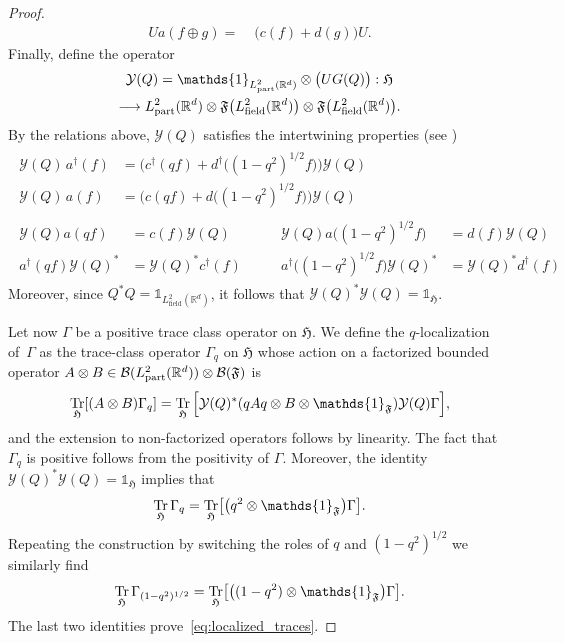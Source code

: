 \documentclass[10pt]{amsart}
\theoremstyle{definition}\newtheorem{defi}[theo]{Definition}\newtheorem{rema}[theo]{Remark}\newtheorem{exam}[theo]{Example}\newtheorem{exem}[theo]{Example}\newtheorem{nota}[theo]{Notation}
\DeclareMathOperator{\Tr}{Tr}
\DeclareMathOperator{\partt}{part}
\DeclareMathOperator{\field}{field}
\newcommand{\cY}{\mathcal{Y}}
\newcommand{\R}{\mathbb{R}}
\newcommand{\gH}{\mathfrak{H}}
\newcommand{\gF}{\mathfrak{F}}
\newcommand{\cB}{\mathcal{B}}
\newcommand{\1}{\mathds{1}}
\let\oldin\in
\renewcommand{\in}{\mathchoice{\oldin}{\oldin}{\,\oldin\,}{\,\oldin\,}}
\renewcommand*{\to}{\mathchoice{\longrightarrow}{\rightarrow}{\rightarrow}{\rightarrow}}
\let\originalleft\left
\let\originalright\right
\renewcommand{\left}{\mathopen{}\mathclose\bgroup\originalleft}
\renewcommand{\right}{\aftergroup\egroup\originalright}
\begin{document}
\begin{proof}
\begin{equation}
\begin{split}
Ua(f\oplus g)=\;&\big(c(f)+d(g)\big)U.
\end{split}
\end{equation}
Finally, define the operator
\begin{multline}
\cY(Q)= \1_{L^2_{\partt}(\R^d)}\otimes \big(UG(Q)\big): \gH\\
\to L^2_{\partt}(\R^d) \otimes \gF\big(L^2_{\field}(\R^d)\big) \otimes \gF\big(L^2_{\field}(\R^d)\big).
\end{multline}
By the relations above, $\cY(Q)$ satisfies the intertwining properties (see \cite[Lemmas~2.14 and 2.15]{DerGer-99})
\begin{equation}\label{eq:intertwining}
\begin{gathered}
\begin{aligned}
\cY(Q)\,a^\dagger(f) &= \Big(c^\dagger(qf)+d^\dagger\big((1-q^2)^{1/2}f\big) \Big)\cY(Q)\\
\cY(Q)\,a(f)&= \Big(c(qf)+d\big((1-q^2)^{1/2}f\big) \Big)\cY(Q)
\end{aligned}
\\
\begin{aligned}
\cY(Q)a(qf) &=c(f)\cY (Q)\qquad &\cY(Q)a\big((1-q^2)^{1/2}f\big) &=d(f)\cY(Q)\\
a^\dagger(qf)\cY(Q)^* &= \cY(Q)^*c^\dagger(f)\qquad &a^\dagger\big((1-q^2)^{1/2}f\big)\cY(Q)^* &= \cY(Q)^*d^\dagger(f)
\end{aligned}
\end{gathered}
\end{equation}
Moreover, since $Q^*Q=\1_{L^2_{\field}(\R^d)}$, it follows that $\cY(Q)^*\cY(Q)=\1_{ \gH}$.

Let now $\Gamma$ be a positive trace class operator on $ \gH$. We define the $q$-localization of~$\Gamma$ as the trace-class operator $\Gamma_q$ on $ \gH$ whose action on a factorized bounded operator $A\otimes B \in \cB(L^2_{\partt}(\R^d))\otimes \cB(\gF)$ is
\begin{equation}
\Tr_{ \gH}\left[(A\otimes B) \Gamma_q \right]=\Tr_{ \gH}\Big[\cY(Q)^* (qAq \otimes B \otimes \1_{\gF}) \cY(Q)\Gamma\Big],
\end{equation}
and the extension to non-factorized operators follows by linearity. The fact that $\Gamma_q$ is positive follows from the positivity of $\Gamma$. Moreover, the identity $\cY(Q)^* \cY(Q)=\1_{ \gH}$ implies that
\begin{equation}
\Tr_{ \gH} \Gamma_q=\Tr_{ \gH} \left[\big(q^2\otimes \1_{\gF}\big)\Gamma\right].
\end{equation}
Repeating the construction by switching the roles of $q$ and $(1-q^2)^{1/2}$ we similarly find
\begin{equation}
\Tr_{ \gH} \Gamma_{(1-q^2)^{1/2}}= \Tr_{ \gH}\left[\big((1-q^2)\otimes \1_{\gF}\big)\Gamma\right].
\end{equation}
The last two identities prove~\eqref{eq:localized_traces}.



\end{proof}
\end{document}
